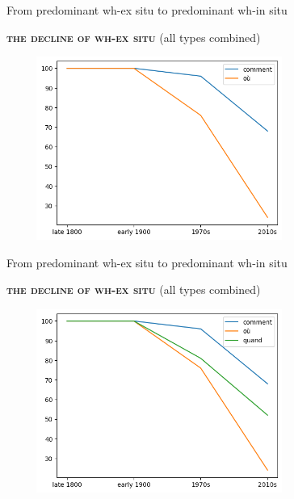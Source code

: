 \documentclass[lesson_slides]{subfiles}
\begin{document}
\begin{frame}[c]{From predominant wh-ex situ to predominant wh-in situ}

    \textbf{\textsc{the decline of wh-ex situ}} (all types combined)
    \begin{center}
        \includegraphics[width=10cm, height=6cm]{images/two.png}
    \end{center}
  
\end{frame}
\begin{frame}[c]{From predominant wh-ex situ to predominant wh-in situ}

    \textbf{\textsc{the decline of wh-ex situ}} (all types combined)
    \begin{center}
        \includegraphics[width=10cm, height=6cm]{images/three.png}
    \end{center}
  
\end{frame}
\end{document}

